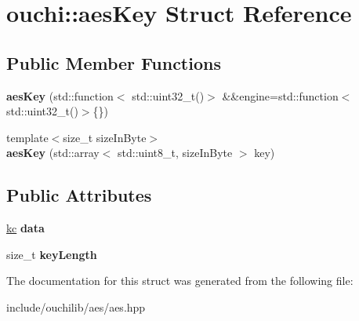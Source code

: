 \hypertarget{structouchi_1_1aes_key}{}\section{ouchi\+::aes\+Key Struct Reference}
\label{structouchi_1_1aes_key}
\subsection*{Public Member Functions}
\begin{DoxyCompactItemize}
\item 
\mbox{\label{structouchi_1_1aes_key_a1ca3b59c1f58ce8b723d101baaa586d3}} 
{\bfseries aes\+Key} (std\+::function$<$ std\+::uint32\+\_\+t()$>$ \&\&engine=std\+::function$<$ std\+::uint32\+\_\+t()$>$\{\})
\item 
\mbox{\label{structouchi_1_1aes_key_ac14993faa74e7fae036a64fbe230589d}} 
{\footnotesize template$<$size\+\_\+t size\+In\+Byte$>$ }\\{\bfseries aes\+Key} (std\+::array$<$ std\+::uint8\+\_\+t, size\+In\+Byte $>$ key)
\end{DoxyCompactItemize}
\subsection*{Public Attributes}
\begin{DoxyCompactItemize}
\item 
\mbox{\label{structouchi_1_1aes_key_a592d770ccc4b3d7e8bcad32cdb90330a}} 
\mbox{\hyperlink{unionouchi_1_1kc}{kc}} {\bfseries data}
\item 
\mbox{\label{structouchi_1_1aes_key_aeb15522bb712163deaaa2f130efd48d9}} 
size\+\_\+t {\bfseries key\+Length}
\end{DoxyCompactItemize}


The documentation for this struct was generated from the following file\+:\begin{DoxyCompactItemize}
\item 
include/ouchilib/aes/aes.\+hpp\end{DoxyCompactItemize}
